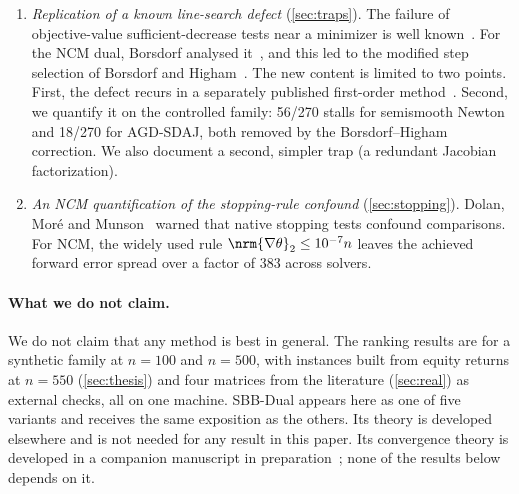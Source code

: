 \begin{enumerate}
    cost is flat in dimension: 5 eigendecompositions at $n=100$ and at
    $n=2105$. Below it the ordering changes with the accuracy target, with the
    solution rank, and with how far the input is from a correlation matrix.
    The rank at which the second and third places exchange is bracketed
    between $r=5$ and $r=20$ at $n=100$ and between $r=50$ and $r=75$ at
    $n=500$, and rises further at $n=2105$ without being resolved there. Only
    a family that varies one spectral quantity at a time makes such an
    association visible.
  \item \emph{Replication of a known line-search defect}
    (\cref{sec:traps}). The failure of objective-value sufficient-decrease
    tests near a minimizer is well known~\cite{hager2005new}. For the NCM dual,
    Borsdorf analysed it~\cite[\S4.7.1]{borsdorf2007newton}, and this led to
    the modified step selection of Borsdorf and
    Higham~\cite{borsdorf2010preconditioned}. The new content is limited to
    two points. First, the defect recurs in a separately published
    first-order method~\cite{huynh2025accelerated}. Second, we quantify it on
    the controlled family: 56/270 stalls for semismooth Newton and 18/270 for
    AGD-SDAJ, both removed by the Borsdorf--Higham correction. We also
    document a second, simpler trap (a redundant Jacobian factorization).
  \item \emph{An NCM quantification of the stopping-rule confound}
    (\cref{sec:stopping}). Dolan, Mor\'e and Munson~\cite{dolan2006optimality}
    warned that native stopping tests confound comparisons. For NCM, the
    widely used rule $\nrm{\nabla\theta}_2\le 10^{-7}n$ leaves the achieved
    forward error spread over a factor of 383 across solvers.
\end{enumerate}

\paragraph{What we do not claim.}
We do not claim that any method is best in general. The ranking results are
for a synthetic family at $n=100$ and $n=500$, with instances built from
equity returns at $n=550$ (\cref{sec:thesis}) and four matrices from the
literature (\cref{sec:real}) as external checks, all on one machine.
SBB-Dual appears here as one of five variants and receives the same
exposition as the others. Its theory is developed elsewhere and is not needed
for any result in this paper.
Its convergence theory is developed in a companion manuscript in
preparation~\cite{ibrahim2026sbb}; none of the results below depends on it.

